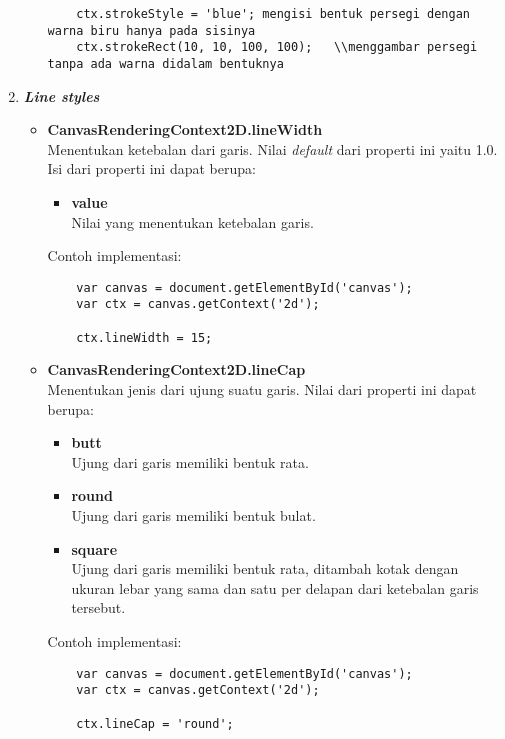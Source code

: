 \begin{enumerate}
\begin{itemize}
\begin{lstlisting}
	ctx.strokeStyle = 'blue'; mengisi bentuk persegi dengan warna biru hanya pada sisinya
	ctx.strokeRect(10, 10, 100, 100);	\\menggambar persegi tanpa ada warna didalam bentuknya
	\end{lstlisting}
	\end{itemize}

	\item \textbf{\textit{Line styles}} \\ 
	\begin{itemize}
		\item \textbf{CanvasRenderingContext2D.lineWidth} \\ Menentukan ketebalan dari garis. Nilai \textit{default} dari properti ini yaitu 1.0. Isi dari properti ini dapat berupa:
		\begin{itemize}
			\item \textbf{value} \\ Nilai yang menentukan ketebalan garis.
		\end{itemize}
		Contoh implementasi:
	\begin{lstlisting}
	var canvas = document.getElementById('canvas');
	var ctx = canvas.getContext('2d');
	
	ctx.lineWidth = 15;
	\end{lstlisting}
	
		\item \textbf{CanvasRenderingContext2D.lineCap} \\ Menentukan jenis dari ujung suatu garis. Nilai dari properti ini dapat berupa:
		\begin{itemize}
			\item \textbf{butt} \\ Ujung dari garis memiliki bentuk rata.
			\item \textbf{round} \\ Ujung dari garis memiliki bentuk bulat.
			\item \textbf{square} \\ Ujung dari garis memiliki bentuk rata, ditambah kotak dengan ukuran lebar yang sama dan satu per delapan dari ketebalan garis tersebut.
		\end{itemize}
		Contoh implementasi:
	\begin{lstlisting}
	var canvas = document.getElementById('canvas');
	var ctx = canvas.getContext('2d');
	
	ctx.lineCap = 'round';
	\end{lstlisting}
	

\end{itemize}
\end{enumerate}
